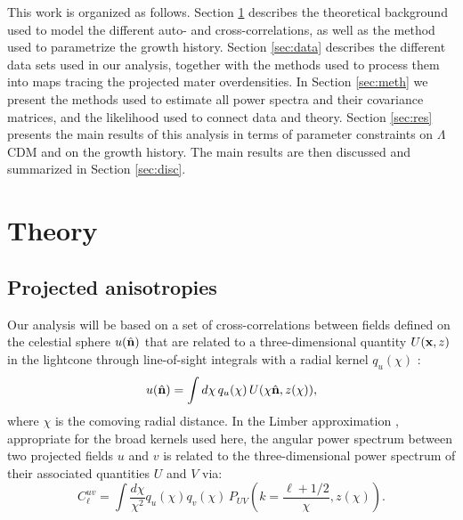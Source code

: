 \documentclass[a4paper,11pt]{article}
\newcommand{\nv}{\hat{\bf n}}
\newcommand{\lcdm}{$\Lambda$CDM\xspace}
\begin{document}
    This work is organized as follows. Section \ref{sec:theory} describes the theoretical background used to model the different auto- and cross-correlations, as well as the method used to parametrize the growth history. Section \ref{sec:data} describes the different data sets used in our analysis, together with the methods used to process them into maps tracing the projected mater overdensities. In Section \ref{sec:meth} we present the methods used to estimate all power spectra and their covariance matrices, and the likelihood used to connect data and theory. Section \ref{sec:res} presents the main results of this analysis in terms of parameter constraints on \lcdm and on the growth history. The main results are then discussed and summarized in Section \ref{sec:disc}.

  \section{Theory}\label{sec:theory}
    \subsection{Projected anisotropies}\label{ssec:theory.signal}
      Our analysis will be based on a set of cross-correlations between fields defined on the celestial sphere $u(\nv)$ that are related to a three-dimensional quantity $U({\bf x},z)$ in the lightcone through line-of-sight integrals with a radial kernel $q_u(\chi)$ \cite{astro-ph/9912508}:
      \begin{equation}\label{eq:projection}
        u(\nv)=\int d\chi\,q_u(\chi)\,U(\chi\nv,z(\chi)),
      \end{equation}
      where $\chi$ is the comoving radial distance. In the Limber approximation \cite{1953ApJ...117..134L}, appropriate for the broad kernels used here, the angular power spectrum between two projected fields $u$ and $v$ is related to the three-dimensional power spectrum of their associated quantities $U$ and $V$ via:
      \begin{equation}\label{eq:limber}
        C^{uv}_\ell=\int\frac{d\chi}{\chi^2}q_u(\chi)q_v(\chi)\,P_{UV}\left(k=\frac{\ell+1/2}{\chi},z(\chi)\right).
      \end{equation}
\end{document}

